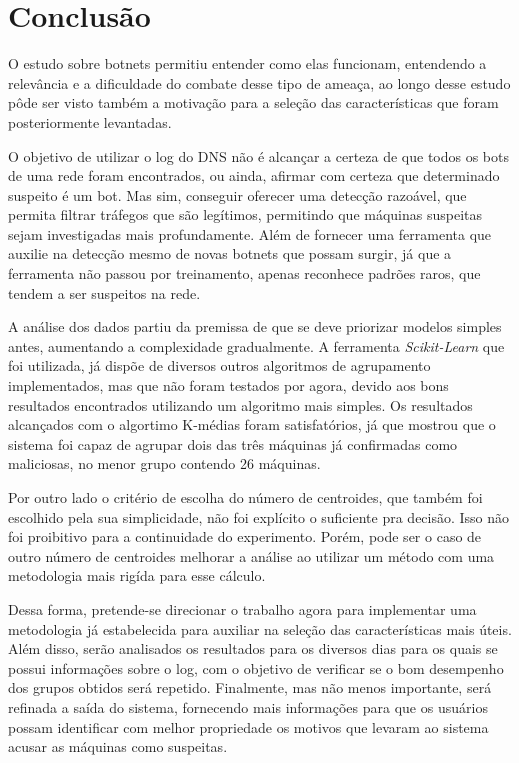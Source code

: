 \chapter{Conclusão}
O estudo sobre botnets permitiu entender como elas funcionam, entendendo a relevância e a dificuldade do combate desse tipo de ameaça, ao longo desse estudo pôde ser visto também a motivação para a seleção das características que foram posteriormente levantadas.

O objetivo de utilizar o log do DNS não é alcançar a certeza de que todos os bots de uma rede foram encontrados, ou ainda, afirmar com certeza que determinado suspeito é um bot. Mas sim, conseguir oferecer uma detecção razoável, que permita filtrar tráfegos que são legítimos, permitindo que máquinas suspeitas sejam investigadas mais profundamente. Além de fornecer uma ferramenta que auxilie na detecção mesmo de novas botnets que possam surgir, já que a ferramenta não passou por treinamento, apenas reconhece padrões raros, que tendem a ser suspeitos na rede.

A análise dos dados partiu da premissa de que se deve priorizar modelos simples antes, aumentando a complexidade gradualmente. A ferramenta \textit{Scikit-Learn} que foi utilizada, já dispõe de diversos outros algoritmos de agrupamento implementados, mas que não foram testados por agora, devido aos bons resultados encontrados utilizando um algoritmo mais simples. Os resultados alcançados com o algortimo K-médias foram satisfatórios, já que mostrou que o sistema foi capaz de agrupar dois das três máquinas já confirmadas como maliciosas, no menor grupo contendo 26 máquinas.

Por outro lado o critério de escolha do número de centroides, que também foi escolhido pela sua simplicidade, não foi explícito o suficiente pra decisão. Isso não foi proibitivo para a continuidade do experimento. Porém, pode ser o caso de outro número de centroides melhorar a análise ao utilizar um método com uma metodologia mais rigída para esse cálculo.

Dessa forma, pretende-se direcionar o trabalho agora para implementar uma metodologia já estabelecida para auxiliar na seleção das características mais úteis. Além disso, serão analisados os resultados para os diversos dias para os quais se possui informações sobre o log, com o objetivo de verificar se o bom desempenho dos grupos obtidos será repetido. Finalmente, mas não menos importante, será refinada a saída do sistema, fornecendo mais informações para que os usuários possam identificar com melhor propriedade os motivos que levaram ao sistema acusar as máquinas como suspeitas.